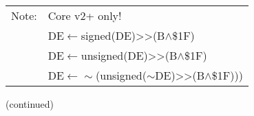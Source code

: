 \documentclass[oneside,a4paper]{book}
\newcommand{\notet}{\rule{0pt}{2.4ex}}
\newcommand{\noteb}{\rule[-1.3ex]{0pt}{0pt}}
\begin{document}
{\begin{tabular}{llcccccccccccccccl}
		\hline

		Note:
			& \multicolumn{17}{l}{\parbox{12cm}{\footnotemark[1] Core v2+ only!}}\notet \\

			& \multicolumn{17}{l}{\parbox{12cm}{\footnotemark[2] DE$\leftarrow$signed(DE)>>(B$\wedge$\$1F)}} \\

			& \multicolumn{17}{l}{\parbox{12cm}{\footnotemark[3] DE$\leftarrow$unsigned(DE)>>(B$\wedge$\$1F)}} \\

			& \multicolumn{17}{l}{\parbox{12cm}{\footnotemark[4] DE$\leftarrow\sim$(unsigned($\sim$DE)>>(B$\wedge$\$1F)))}}\noteb \\

		\hline

	\end{tabular}
}

(continued)\\
\end{document}
